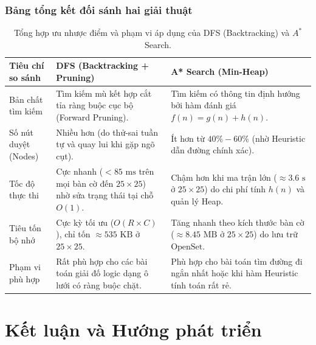 \documentclass[a4paper]{article}
\begin{document}
\subsubsection{Bảng tổng kết đối sánh hai giải thuật}
\begin{table}[H]
\centering
\caption{Tổng hợp ưu nhược điểm và phạm vi áp dụng của DFS (Backtracking) và $A^*$ Search.}
\label{tab:algo_comparison}
\renewcommand{\arraystretch}{1.35}
\begin{tabularx}{\textwidth}{|>{\raggedright\arraybackslash}p{3.0cm}|>{\raggedright\arraybackslash}X|>{\raggedright\arraybackslash}X|}
\hline
\textbf{Tiêu chí so sánh} & \textbf{DFS (Backtracking + Pruning)} & \textbf{A* Search (Min-Heap)} \\
\hline
Bản chất tìm kiếm & Tìm kiếm mù kết hợp cắt tỉa ràng buộc cục bộ (Forward Pruning). & Tìm kiếm có thông tin định hướng bởi hàm đánh giá $f(n) = g(n) + h(n)$. \\
\hline
Số nút duyệt (Nodes) & Nhiều hơn (do thử-sai tuần tự và quay lui khi gặp ngõ cụt). & Ít hơn từ $40\% - 60\%$ (nhờ Heuristic dẫn đường chính xác). \\
\hline
Tốc độ thực thi & Cực nhanh ($< 85\text{ ms}$ trên mọi bàn cờ đến $25 \times 25$) nhờ sửa trạng thái tại chỗ $O(1)$. & Chậm hơn khi ma trận lớn ($\approx 3.6\text{ s}$ ở $25 \times 25$) do chi phí tính $h(n)$ và quản lý Heap. \\
\hline
Tiêu tốn bộ nhớ & Cực kỳ tối ưu ($O(R \times C)$), chỉ tốn $\approx 535\text{ KB}$ ở $25 \times 25$. & Tăng nhanh theo kích thước bàn cờ ($\approx 8.45\text{ MB}$ ở $25 \times 25$) do lưu trữ $\text{OpenSet}$. \\
\hline
Phạm vi phù hợp & Rất phù hợp cho các bài toán giải đố logic dạng ô lưới có ràng buộc chặt. & Phù hợp cho bài toán tìm đường đi ngắn nhất hoặc khi hàm Heuristic tính toán rất rẻ. \\
\hline
\end{tabularx}
\end{table}

\newpage

\section{Kết luận và Hướng phát triển}
\end{document}
